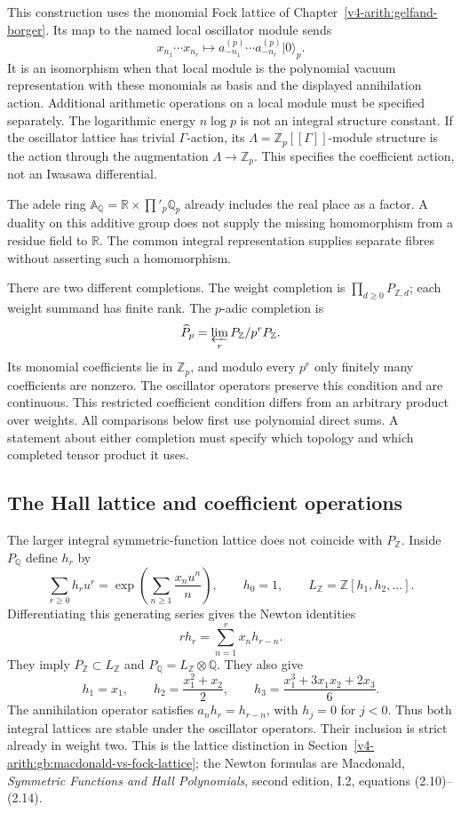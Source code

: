 This construction uses the monomial Fock lattice of
Chapter~\ref{v4-arith:gelfand-borger}. Its map to the named local
oscillator module sends
\[
 x_{n_1}\cdots x_{n_r}\longmapsto
 a_{-n_1}^{(p)}\cdots a_{-n_r}^{(p)}|0\rangle_p.
\]
It is an isomorphism when that local module is the polynomial vacuum
representation with these monomials as basis and the displayed
annihilation action. Additional arithmetic operations on a local module
must be specified separately. The logarithmic energy $n\log p$ is not
an integral structure constant. If the oscillator lattice has trivial
$\Gamma$-action, its $\Lambda=\mathbb Z_p[[\Gamma]]$-module structure
is the action through the augmentation $\Lambda\to\mathbb Z_p$.
This specifies the coefficient action, not an Iwasawa differential.

\begin{remark}
\label{v4-arith:pos-costello:rem:adelic-Pontryagin}
The adele ring $\mathbb A_{\mathbb Q}=\mathbb R\times\prod'_p\mathbb Q_p$
already includes the real place as a factor. A duality on this additive
group does not supply the missing homomorphism from a residue field to
$\mathbb R$. The common integral representation supplies separate fibres
without asserting such a homomorphism.
\end{remark}

There are two different completions. The weight completion is
$\prod_{d\ge0}P_{\mathbb Z,d}$; each weight summand has finite rank.
The $p$-adic completion is
\[
 \widehat P_p=\varprojlim_r P_{\mathbb Z}/p^rP_{\mathbb Z}.
\]
Its monomial coefficients lie in $\mathbb Z_p$, and modulo every $p^r$
only finitely many coefficients are nonzero. The oscillator operators
preserve this condition and are continuous. This restricted coefficient
condition differs from an arbitrary product over weights. All comparisons
below first use polynomial direct sums. A statement about either
completion must specify which topology and which completed tensor product
it uses.

\subsection{The Hall lattice and coefficient operations}

The larger integral symmetric-function lattice does not coincide with
$P_{\mathbb Z}$. Inside $P_{\mathbb Q}$ define $h_r$ by
\[
 \sum_{r\ge0}h_ru^r
 =\exp\!\left(\sum_{n\ge1}\frac{x_nu^n}{n}\right),\qquad h_0=1,
 \qquad L_{\mathbb Z}=\mathbb Z[h_1,h_2,\ldots].
\]
Differentiating this generating series gives the Newton identities
\[
 rh_r=\sum_{n=1}^r x_nh_{r-n}.
\]
They imply $P_{\mathbb Z}\subset L_{\mathbb Z}$ and
$P_{\mathbb Q}=L_{\mathbb Z}\otimes\mathbb Q$.
They also give
\[
 h_1=x_1,\qquad h_2=\frac{x_1^2+x_2}{2},\qquad
 h_3=\frac{x_1^3+3x_1x_2+2x_3}{6}.
\]
The annihilation operator satisfies $a_nh_r=h_{r-n}$, with $h_j=0$
for $j<0$. Thus both integral lattices are stable under the oscillator
operators. Their inclusion is strict already in weight two.
This is the lattice distinction in
Section~\ref{v4-arith:gb:macdonald-vs-fock-lattice}; the Newton formulas
are Macdonald, \emph{Symmetric Functions and Hall Polynomials},
second edition, I.2, equations (2.10)--(2.14).

